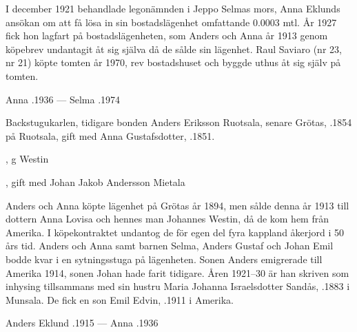 I december 1921 behandlade legonämnden i Jeppo Selmas mors, Anna Eklunds ansökan om att få lösa in sin bostadslägenhet omfattande 0.0003 mtl. År 1927 fick hon lagfart på bostadslägenheten, som Anders och Anna år 1913 genom köpebrev undantagit  åt sig själva då de sålde sin lägenhet. Raul Saviaro (nr 23, nr 21) köpte tomten år 1970, rev bostadshuset och byggde uthus åt sig själv på tomten.

Anna .1936  ---  Selma .1974


Backstugukarlen, tidigare bonden Anders Eriksson Ruotsala, senare Grötas, .1854 på Ruotsala, gift med Anna Gustafsdotter, .1851.
\begin{jhchildren}
  \item {}
  \item {}, g Westin
  \item {}
  \item {}
  \item {}, gift med Johan Jakob Andersson Mietala
  \item {}
  \item {}
\end{jhchildren}

Anders och Anna köpte lägenhet på Grötas år 1894, men sålde denna år 1913 till dottern Anna Lovisa och hennes man Johannes Westin, då de kom hem från Amerika. I köpekontraktet undantog de för egen del fyra kappland åkerjord i 50 års tid. Anders och Anna samt barnen Selma, Anders Gustaf och Johan Emil bodde kvar i en sytningsstuga på lägenheten. Sonen Anders emigrerade till Amerika 1914, sonen Johan hade farit tidigare. Åren 1921–30 är han skriven som inhysing tillsammans med sin hustru Maria Johanna Israelsdotter Sandås, .1883 i Munsala. De fick en son Emil Edvin, .1911 i Amerika.

Anders Eklund .1915  ---  Anna .1936





